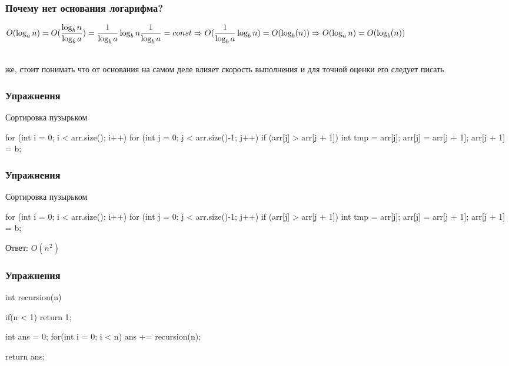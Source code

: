 
\begin{frame}
    \frametitle{Почему нет основания логарифма?}
    \quad $O(\log_a{n})=O(\dfrac{\log_b{n}}{\log_b{a}})=\dfrac{1}{\log_b{a}}\log_b{n}\\ \dfrac{1}{\log_b{a}}=const \Rightarrow O(\dfrac{1}{\log_b{a}}\log_b{n})=O(\log_b(n))\Rightarrow O(\log_a{n}) = O(\log_b(n))$

\\
     же, стоит понимать что от основания на самом деле влияет скорость выполнения и для точной оценки его следует писать
\end{frame}


\begin{frame}[fragile]
    \frametitle{Упражнения}
    
    Сортировка пузырьком
    \begin{cpp}
        for (int i = 0; i < arr.size(); i++) {
            for (int j = 0; j < arr.size()-1; j++) {
                if (arr[j] > arr[j + 1]) {
                    int tmp = arr[j];
                    arr[j] = arr[j + 1];
                    arr[j + 1] = b;
                }
            }
        }
    \end{cpp}
    
\end{frame}


\begin{frame}[fragile]
    \frametitle{Упражнения}
    
    Сортировка пузырьком
    \begin{cpp}
        for (int i = 0; i < arr.size(); i++) {
            for (int j = 0; j < arr.size()-1; j++) {
                if (arr[j] > arr[j + 1]) {
                    int tmp = arr[j];
                    arr[j] = arr[j + 1];
                    arr[j + 1] = b;
                }
            }
        }
    \end{cpp}

    Ответ: $O(n^2)$

\end{frame}


\begin{frame}[fragile]
    \frametitle{Упражнения}
    
    \begin{cpp}
        int recursion(n){
            if(n < 1){
                return 1;
            }

            int ans = 0;
            for(int i = 0; i < n){
                ans += recursion(n);
            }

            return ans;
        }
    \end{cpp}
    
\end{frame}

